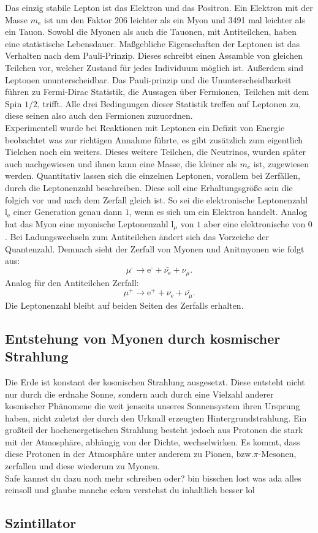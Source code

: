 Das einzig stabile Lepton ist das Elektron und das Positron. Ein Elektron mit der Masse $m_\text{e}$ ist um den Faktor 206 leichter als ein Myon und 3491 mal leichter als ein Tauon. 
Sowohl die Myonen als auch die Tauonen, mit Antiteilchen, haben eine statistische Lebensdauer. Maßgebliche Eigenschaften der
Leptonen ist das Verhalten nach dem Pauli-Prinzip. Dieses schreibt einen Assamble von gleichen Teilchen vor, welcher Zustand für jedes Individuum möglich ist. Außerdem sind Leptonen 
ununterscheidbar.  Das Pauli-prinzip und die Ununterscheidbarkeit führen zu Fermi-Dirac Statistik, die Aussagen über Fermionen, Teilchen mit dem Spin $1/2$, trifft. Alle drei Bedingungen dieser Statistik
treffen auf Leptonen zu, diese seinen also auch den Fermionen zuzuordnen.  
\\
\newline
Experimentell wurde bei Reaktionen mit Leptonen ein Defizit von Energie beobachtet was zur richtigen Annahme führte, es gibt zusätzlich zum eigentlich Tielchen noch ein weiters. 
Dieses weitere Teilchen, die Neutrinos, wurden später auch nachgewiesen und ihnen kann eine Masse, die kleiner als $m_e$ ist, zugewiesen werden.
Quantitativ lassen sich die einzelnen Leptonen, vorallem bei Zerfällen, durch die Leptonenzahl beschreiben. Diese soll eine Erhaltungsgröße sein
die folgich vor und nach dem Zerfall gleich ist. So sei die elektronische Leptonenzahl $\text{l}_\text{e}$ einer Generation genau dann $1$, wenn es sich um ein Elektron handelt. 
Analog hat das Myon eine myonische Leptonenzahl $\text{l}_\mu$ von $1$ aber eine elektronische von $0$. Bei Ladungswechseln zum Antiteilchen ändert sich das Vorzeiche der Quantenzahl.
Demnach sieht der Zerfall von Myonen und Anitmyonen wie folgt aus:
\begin{equation*}
    \mu^\text{-} \rightarrow \text{e}^\text{-} + \bar{\nu_\text{e}} + \nu_\mu.
\end{equation*}
Analog für den Antiteilchen Zerfall:
\begin{equation*}
    \mu^\text{+} \rightarrow \text{e}^\text{+} + \nu_\text{e} + \bar{\nu_\mu}.
\end{equation*}
Die Leptonenzahl bleibt auf beiden Seiten des Zerfalls erhalten. 

\subsection{Entstehung von Myonen durch kosmischer Strahlung}
Die Erde ist konstant der kosmischen Strahlung ausgesetzt. Diese entsteht nicht nur durch die erdnahe Sonne, sondern auch durch eine Vielzahl anderer kosmischer Phänomene die weit jenseits unseres Sonnensystem ihren Ursprung haben, nicht zuletzt der
durch den Urknall erzeugten Hintergrundstrahlung. Ein großteil der hochenergetischen Strahlung besteht jedoch aus Protonen die stark mit der Atmosphäre, abhängig von der Dichte, wechselwirken.
Es kommt, dass diese Protonen in der Atmosphäre unter anderem zu Pionen, bzw.$\pi$-Mesonen, zerfallen und diese wiederum zu Myonen. 
\\
\newline
Safe kannst du dazu noch mehr schreiben oder? bin bisschen lost was ada alles reinsoll und glaube manche ecken verstehst du inhaltlich besser lol


\subsection{Szintillator}